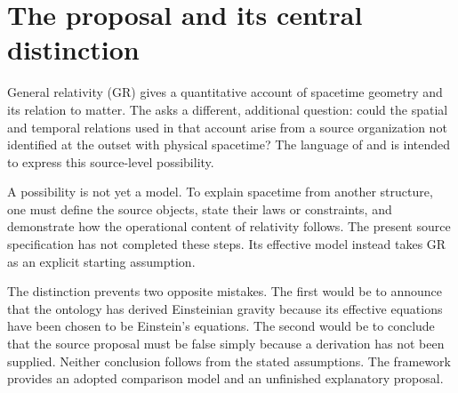 \documentclass[11pt]{article}
\begin{document}

\section{The proposal and its central distinction}
General relativity (GR) gives a quantitative account of spacetime geometry and its relation to matter. The \TheoryProgram{} asks a different, additional question: could the spatial and temporal relations used in that account arise from a source organization not identified at the outset with physical spacetime? The language of \Aether{} and \Aflow{} is intended to express this source-level possibility.

A possibility is not yet a model. To explain spacetime from another structure, one must define the source objects, state their laws or constraints, and demonstrate how the operational content of relativity follows. The present source specification has not completed these steps. Its effective model instead takes GR as an explicit starting assumption.

The distinction prevents two opposite mistakes. The first would be to announce that the ontology has derived Einsteinian gravity because its effective equations have been chosen to be Einstein's equations. The second would be to conclude that the source proposal must be false simply because a derivation has not been supplied. Neither conclusion follows from the stated assumptions. The framework provides an adopted comparison model and an unfinished explanatory proposal.
\end{document}
